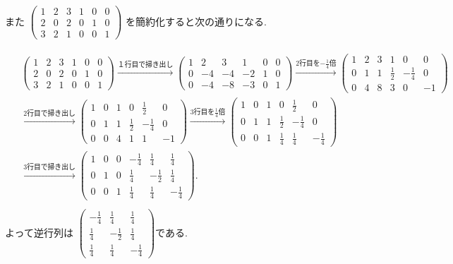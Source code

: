 \documentclass[dvipdfmx,a4paper,11pt]{article}
\theoremstyle{definition}
\begin{document}
 また
 $
  \begin{pmatrix}
1 &2&3 &1 & 0 & 0\\
2 & 0 & 2 &0 & 1 & 0\\
3&2 &1 &0 & 0 & 1
 \end{pmatrix}
 $
を簡約化すると次の通りになる.
 
 \begin{align*}
\begin{split}
 & \begin{pmatrix}
1 &2&3 &1 & 0 & 0\\
2 & 0 & 2 &0 & 1 & 0\\
3&2 &1 &0 & 0 & 1
 \end{pmatrix}
  \overset{\text{１行目で掃き出し}}{\longrightarrow} 
 \begin{pmatrix}
1 &2&3 &1 & 0 & 0\\
0  & -4 & -4 &-2& 1& 0\\
0& -4 &-8 &-3 & 0 & 1
 \end{pmatrix} 
  \overset{\text{2行目を$-\frac{1}{4}$倍}}{\longrightarrow} 
 \begin{pmatrix}
1 &2&3 &1 & 0 & 0\\
0  & 1 & 1 &\frac{1}{2} & -\frac{1}{4} & 0\\
0& 4 &8 &3 & 0 & -1
 \end{pmatrix} \\
 &\overset{\text{2行目で掃き出し}}{\longrightarrow} 
  \begin{pmatrix}
1 &0&1 &0 & \frac{1}{2} & 0\\
0  & 1 & 1 &\frac{1}{2} & -\frac{1}{4} & 0\\
0& 0 &4 &1 & 1 & -1
 \end{pmatrix} 
  \overset{\text{3行目を$\frac{1}{4}$倍}}{\longrightarrow} 
 \begin{pmatrix}
1 &0&1 &0 & \frac{1}{2} & 0\\
0  & 1 & 1 &\frac{1}{2} & -\frac{1}{4} & 0\\
0& 0 &1 &\frac{1}{4}  & \frac{1}{4}  & -\frac{1}{4} 
 \end{pmatrix} \\
  &\overset{\text{3行目で掃き出し}}{\longrightarrow} 
  \begin{pmatrix}
1 &0&0 &-\frac{1}{4}  & \frac{1}{4}  & \frac{1}{4} \\
0  & 1 & 0&\frac{1}{4}  & -\frac{1}{2} & \frac{1}{4} \\
0& 0 &1 &\frac{1}{4}  & \frac{1}{4}  & -\frac{1}{4} 
 \end{pmatrix}. \\
\end{split}
\end{align*}
よって逆行列は
$\begin{pmatrix}
-\frac{1}{4}  & \frac{1}{4}  & \frac{1}{4} \\
\frac{1}{4}  & -\frac{1}{2} & \frac{1}{4} \\
\frac{1}{4}  & \frac{1}{4}  & -\frac{1}{4} 
 \end{pmatrix} 
 $である.
  \vspace{11pt}
\end{document}
